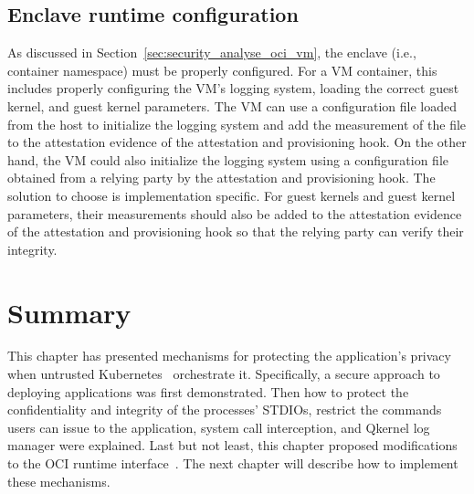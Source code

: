 \subsection{Enclave runtime configuration}

As discussed in Section~\ref{sec:security_analyse_oci_vm}, the enclave (i.e., container namespace) must be properly configured. For a VM container, this includes properly configuring the VM's logging system, loading the correct guest kernel, and guest kernel parameters. The VM can use a configuration file loaded from the host to initialize the logging system 
and add the measurement of the file to the attestation evidence of the attestation and provisioning hook. On the other hand, the VM could also initialize the logging system using a configuration file obtained from a relying party by the attestation and provisioning hook. The solution to choose is implementation specific. For guest kernels and guest kernel parameters, their 
measurements should also be added to the attestation evidence of the attestation and provisioning hook so that the relying party can verify their integrity.
  

\section{Summary}
This chapter has presented mechanisms for protecting the application's privacy when untrusted Kubernetes~\cite*{k8s} orchestrate it. Specifically, a secure approach to deploying applications was first demonstrated. Then how to protect 
the confidentiality and integrity of the processes' STDIOs, restrict the commands users can issue to the application, system call interception, and Qkernel log manager were explained. Last but not least, this chapter proposed modifications to the OCI runtime interface~\cite*{oci-runtime-spec}. 
The next chapter will describe how to implement these mechanisms. 
\cleardoublepage

